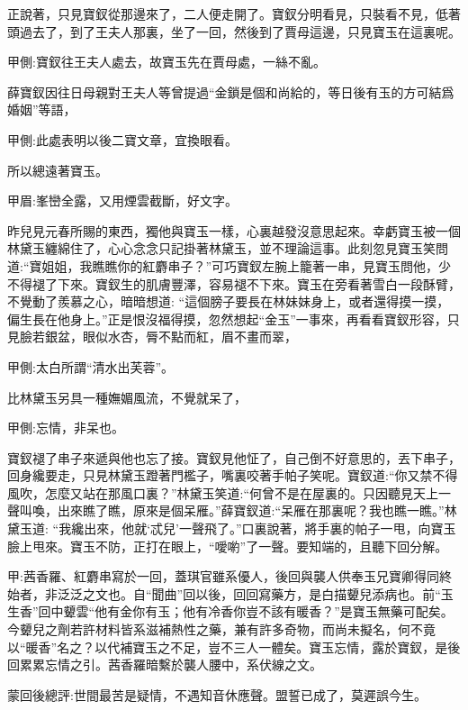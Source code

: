 \begin{parag}
    正說著，只見寶釵從那邊來了，二人便走開了。寶釵分明看見，只裝看不見，低著頭過去了，到了王夫人那裏，坐了一回，然後到了賈母這邊，只見寶玉在這裏呢。\begin{note}甲側:寶釵往王夫人處去，故寶玉先在賈母處，一絲不亂。\end{note}薛寶釵因往日母親對王夫人等曾提過“金鎖是個和尚給的，等日後有玉的方可結爲婚姻”等語，\begin{note}甲側:此處表明以後二寶文章，宜換眼看。\end{note}所以總遠著寶玉。\begin{note}甲眉:峯巒全露，又用煙雲截斷，好文字。\end{note}昨兒見元春所賜的東西，獨他與寶玉一樣，心裏越發沒意思起來。幸虧寶玉被一個林黛玉纏綿住了，心心念念只記掛著林黛玉，並不理論這事。此刻忽見寶玉笑問道:“寶姐姐，我瞧瞧你的紅麝串子？”可巧寶釵左腕上籠著一串，見寶玉問他，少不得褪了下來。寶釵生的肌膚豐澤，容易褪不下來。寶玉在旁看著雪白一段酥臂，不覺動了羨慕之心，暗暗想道: “這個膀子要長在林妹妹身上，或者還得摸一摸，偏生長在他身上。”正是恨沒福得摸，忽然想起“金玉”一事來，再看看寶釵形容，只見臉若銀盆，眼似水杏，脣不點而紅，眉不畫而翠，\begin{note}甲側:太白所謂“清水出芙蓉”。\end{note}比林黛玉另具一種嫵媚風流，不覺就呆了，\begin{note}甲側:忘情，非呆也。\end{note}寶釵褪了串子來遞與他也忘了接。寶釵見他怔了，自己倒不好意思的，丟下串子，回身纔要走，只見林黛玉蹬著門檻子，嘴裏咬著手帕子笑呢。寶釵道:“你又禁不得風吹，怎麼又站在那風口裏？”林黛玉笑道:“何曾不是在屋裏的。只因聽見天上一聲叫喚，出來瞧了瞧，原來是個呆雁。”薛寶釵道:“呆雁在那裏呢？我也瞧一瞧。”林黛玉道: “我纔出來，他就‘忒兒’一聲飛了。”口裏說著，將手裏的帕子一甩，向寶玉臉上甩來。寶玉不防，正打在眼上，“噯喲”了一聲。要知端的，且聽下回分解。
\end{parag}


\begin{parag}
    \begin{note}甲:茜香羅、紅麝串寫於一回，蓋琪官雖系優人，後回與襲人供奉玉兄寶卿得同終始者，非泛泛之文也。自“聞曲”回以後，回回寫藥方，是白描顰兒添病也。前“玉生香”回中顰雲“他有金你有玉；他有冷香你豈不該有暖香？”是寶玉無藥可配矣。今顰兒之劑若許材料皆系滋補熱性之藥，兼有許多奇物，而尚未擬名，何不竟以“暖香”名之？以代補寶玉之不足，豈不三人一體矣。寶玉忘情，露於寶釵，是後回累累忘情之引。茜香羅暗繫於襲人腰中，系伏線之文。\end{note}
\end{parag}


\begin{parag}
    \begin{note}蒙回後總評:世間最苦是疑情，不遇知音休應聲。盟誓已成了，莫遲誤今生。\end{note}
\end{parag}
